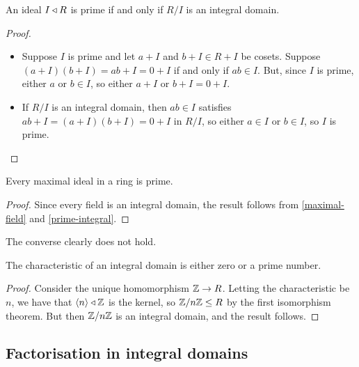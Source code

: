 \documentclass{../template/note}
\begin{document}
    \begin{proposition}
        \label{prime-integral}
        An ideal $I \triangleleft R$ is prime if and only if $R/I$ is an integral domain.
    \end{proposition}
    
    \begin{proof}
        \begin{itemize}
            \item[$\implies$] Suppose $I$ is prime and let $a + I$ and $b + I \in R + I$ be cosets. Suppose $(a + I)(b + I) = ab + I = 0 + I$ if and only if $ab \in I$. But, since $I$ is prime, either $a$ or $b \in I$, so either $a + I$ or $b + I = 0 + I$.
            \item[$\impliedby$] If $R/I$ is an integral domain, then $ab \in I$ satisfies $ab + I = (a + I)(b + I) = 0 + I$ in $R/I$, so either $a \in I$ or $b \in I$, so $I$ is prime.
        \end{itemize}
    \end{proof}
    
    \begin{corollary}
        Every maximal ideal in a ring is prime.
    \end{corollary}
    
    \begin{proof}
        Since every field is an integral domain, the result follows from \cref{maximal-field} and \cref{prime-integral}.
    \end{proof}
    
    \begin{remark*}
        The converse clearly does not hold.
    \end{remark*}
    
    \begin{proposition}
        The characteristic of an integral domain is either zero or a prime number.
    \end{proposition}
    
    \begin{proof}
        Consider the unique homomorphism $\mathbb Z \to R$. Letting the characteristic be $n$, we have that $\left \langle n \right \rangle \triangleleft \mathbb Z$ is the kernel, so $\mathbb Z/n\mathbb Z \leq R$ by the first isomorphism theorem. But then $\mathbb Z/n\mathbb Z$ is an integral domain, and the result follows.
    \end{proof}
    
    \subsection{Factorisation in integral domains}
\end{document}
